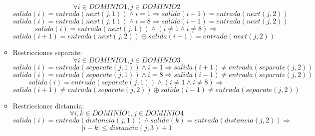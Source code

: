 \documentclass[12pt]{article}
\begin{document}
\begin{itemize}
\begin{itemize}
\begin{equation*}
\forall i \in DOMINIO1, j \in DOMINIO2
\end{equation*}
\begin{equation*}
salida(i) = entrada(next(j,1)) \land i = 1 \Rightarrow salida(i+1) = entrada(next(j,2))
\end{equation*}
\begin{equation*}
salida(i) = entrada(next(j,1)) \land i = 8 \Rightarrow salida(i-1) = entrada(next(j,2))
\end{equation*}
\begin{equation*}
salida(i) = entrada(next(j,1)) \land (i \neq 1 \land i \neq 8) \Rightarrow
\end{equation*}
\begin{equation*}
salida(i+1) = entrada(next(j,2)) \oplus salida(i-1) = entrada(next(j,2))
\end{equation*}
\item Restricciones separate:
\begin{equation*}
\forall i \in DOMINIO1, j \in DOMINIO3
\end{equation*}
\begin{equation*}
salida(i) = entrada(separate(j,1)) \land i = 1 \Rightarrow salida(i+1) \neq entrada(separate(j,2))
\end{equation*}
\begin{equation*}
salida(i) = entrada(separate(j,1)) \land i = 8 \Rightarrow salida(i-1) \neq entrada(separate(j,2))
\end{equation*}
\begin{equation*}
salida(i) = entrada(separate(j,1)) \land (i \neq 1 \land i \neq 8) \Rightarrow
\end{equation*}
\begin{equation*}
salida(i+1) \neq entrada(separate(j,2)) \oplus salida(i-1) \neq entrada(separate(j,2))
\end{equation*}
\item Restricciones distancia:
\begin{equation*}
\forall i,k \in DOMINIO1, j \in DOMINIO4
\end{equation*}
\begin{equation*}
salida(i) = entrada(distancia(j,1)) \land salida(k) = entrada(distancia(j,2)) \Rightarrow
\end{equation*}
\begin{equation*}
|i-k| \leq distancia(j,3)+1
\end{equation*}
\end{itemize}
\end{itemize}
\end{document}
